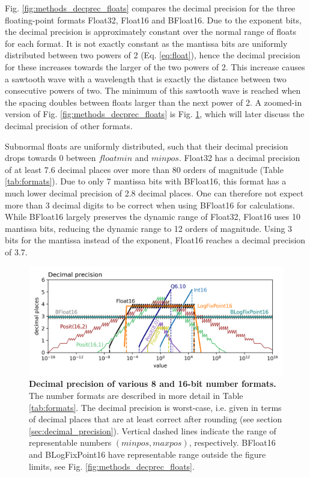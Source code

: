 Fig. \ref{fig:methods_decprec_floats} compares the decimal precision for the three floating-point formats Float32, Float16
and BFloat16. Due to the exponent bits, the decimal precision is approximately constant over the normal range of 
floats for each format. It is not exactly constant as the mantissa bits are uniformly distributed between two powers of 2
(Eq. \ref{eq:float}), hence the decimal precision for these increases towards the larger of the two powers of 2. This
increase causes a sawtooth wave with a wavelength that is exactly the distance between two consecutive powers
of two. The minimum of this sawtooth wave is reached when the spacing doubles between floats larger than the
next power of 2. A zoomed-in version of Fig. \ref{fig:methods_decprec_floats} is Fig. \ref{fig:methods_decimal_precision_all},
which will later discuss the decimal precision of other formats.

Subnormal floats are uniformly distributed, such that their decimal precision drops towards 0 between
$floatmin$ and $minpos$. Float32 has a decimal precision of at least 7.6 decimal places over more than 80 orders
of magnitude (Table \ref{tab:formats}). Due to only 7 mantissa bits with BFloat16, this format has a much lower
decimal precision of 2.8 decimal places. One can therefore not expect more than 3 decimal digits to be correct
when using BFloat16 for calculations. While BFloat16 largely preserves the dynamic range of Float32, Float16
uses 10 mantissa bits, reducing the dynamic range to 12 orders of magnitude. Using 3 bits for the mantissa instead
of the exponent, Float16 reaches a decimal precision of 3.7. 

\begin{figure}[tbhp]
	\includegraphics[width=1\textwidth]{Figures/methods/decimal_precision_all.png}
	\caption{\textbf{Decimal precision of various 8 and 16-bit number formats.} The number formats are described
	in more detail in Table \ref{tab:formats}. The decimal precision is worst-case, i.e. given in terms of decimal places
	that are at least correct after rounding (see section \ref{sec:decimal_precision}). Vertical dashed lines indicate
	the range of representable numbers $(minpos,maxpos)$, respectively. BFloat16 and BLogFixPoint16 have 
	representable range outside the figure limits, see Fig. \ref{fig:methods_decprec_floats}.}
	\label{fig:methods_decimal_precision_all}
\end{figure}

